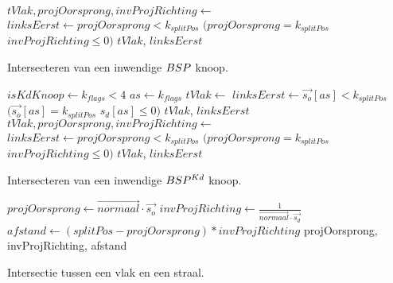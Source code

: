 \begin{dutchalgorithm}
    \begin{algorithmic}       
            \State $tVlak, projOorsprong, invProjRichting \gets $ 
            \State $linksEerst \gets projOorsprong < k_{splitPos}$ \Or $(projOorsprong = k_{splitPos}$ \And $invProjRichting \leq 0)$
            \State \Return $tVlak$, $linksEerst$
        \EndFunction
    \end{algorithmic}
    \caption{Intersecteren van een inwendige $BSP$ knoop.}
\end{dutchalgorithm}

\begin{dutchalgorithm}
    \begin{algorithmic}       
            \State $isKdKnoop \gets k_{flags} < 4$
                \State $as \gets k_{flags}$
                \State $tVlak \gets $ 
                \State $linksEerst \gets \vec{s_o}[as] < k_{splitPos}$ \Or $(\vec{s_o}[as] = k_{splitPos}$ \And $s_d[as] \leq 0)$
                \State \Return $tVlak$, $linksEerst$
            \Else
                \State $tVlak, projOorsprong, invProjRichting \gets $ 
                 \State $linksEerst \gets projOorsprong < k_{splitPos}$ \Or $(projOorsprong = k_{splitPos}$ \And $invProjRichting \leq 0)$
                \State \Return $tVlak$, $linksEerst$
            \EndIf
        \EndFunction
    \end{algorithmic}
    \caption{Intersecteren van een inwendige $BSP^{Kd}$ knoop.}
\end{dutchalgorithm}

\begin{dutchalgorithm}
    \begin{algorithmic}       
            \State $projOorsprong \gets \vec{normaal} \cdot \vec{s_o}$
            \State $invProjRichting \gets \frac{1}{\vec{normaal} \cdot \vec{s_d}}$
            \State $afstand \gets (splitPos - projOorsprong) * invProjRichting $
            \State \Return projOorsprong, invProjRichting, afstand
        \EndFunction
    \end{algorithmic}
    \caption{Intersectie tussen een vlak en een straal.}
\end{dutchalgorithm}


